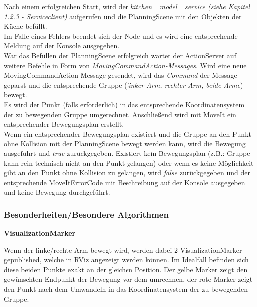 \documentclass{suturo}
\begin{document}
Nach einem erfolgreichen Start, wird der \textit{kitchen\_ model\_ service (siehe Kapitel 1.2.3 - Serviceclient)} aufgerufen und die PlanningScene mit den Objekten der Küche befüllt. \\
Im Falle eines Fehlers beendet sich der Node und es wird eine entsprechende Meldung auf der Konsole ausgegeben. \\
War das Befüllen der PlanningScene erfolgreich wartet der ActionServer auf weitere Befehle in Form von \textit{MovingCommandAction-Messages}.
Wird eine neue MovingCommandAction-Message gesendet, wird das \textit{Command} der Message geparst und die entsprechende Gruppe (\textit{linker Arm, rechter Arm, beide Arme}) bewegt. \\
Es wird der Punkt (falls erforderlich) in das entsprechende Koordinatensystem der zu bewegenden Gruppe umgerechnet. Anschließend wird mit MoveIt ein entsprechender Bewegungsplan erstellt.\\ 
Wenn ein entsprechender Bewegungsplan existiert und die Gruppe an den Punkt ohne Kollision mit der PlanningScene bewegt werden kann, wird die Bewegung ausgeführt und \textit{true} zurückgegeben.
Existiert kein Bewegungsplan (z.B.: Gruppe kann rein technisch nicht an den Punkt gelangen) oder  wenn es keine Möglichkeit gibt an den Punkt ohne Kollision zu gelangen, wird \textit{false} zurückgegeben und der entsprechende MoveItErrorCode mit Beschreibung auf der Konsole ausgegeben und keine Bewegung durchgeführt. \\





\subsubsection{Besonderheiten/Besondere Algorithmen}

\textbf{VisualizationMarker}

Wenn der linke/rechte Arm bewegt wird, werden dabei 2 VisualizationMarker gepublished, welche in RViz angezeigt werden können. Im Idealfall befinden sich diese beiden Punkte exakt an der gleichen Position. Der gelbe Marker zeigt den gewünschten Endpunkt der Bewegung vor dem umrechnen, der rote Marker zeigt den Punkt nach dem Umwandeln in das Koordinatensystem der zu bewegenden Gruppe.
\end{document}
